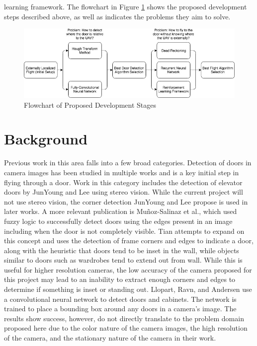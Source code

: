 \documentclass[12pt]{article}
\begin{document}
learning framework. The flowchart in Figure \ref{flowchart} shows the proposed development steps described above, as well as indicates the problems they aim to solve.

\begin{figure}
	\centering
	\includegraphics[scale=.55]{flowchart}
	\vspace{10pt}
	\caption[Flowchart of Proposed Development Stages]{Flowchart of Proposed Development Stages}
	\label{flowchart}
\end{figure}

\section{Background}
Previous work in this area falls into a few broad categories. Detection of doors in camera images has been studied in multiple works and is a key initial step in flying through a door. Work in this category includes the detection of elevator doors by JunYoung and Lee \cite{ElevatorDoors} using stereo vision. While the current project will not use stereo vision, the corner detection JunYoung and Lee propose is used in later works. A more relevant publication is Mu\~noz-Salinaz et al.\cite{Fuzzy}, which used fuzzy logic to successfully detect doors using the edges present in an image including when the door is not completely visible. Tian \cite{Tian2013} attempts to expand on this concept and uses the detection of frame corners and edges to indicate a door, along with the heuristic that doors tend to be inset in the wall, while objects similar to doors such as wardrobes tend to extend out from wall. While this is useful for higher resolution cameras, the low accuracy of the camera proposed for this project may lead to an inability to extract enough corners and edges to determine if something is inset or standing out. Llopart, Ravn, and Andersen\cite{NNDoor} use a convolutional neural network to detect doors and cabinets. The network is trained to place a bounding box around any doors in a camera's image. The results show success, however, do not directly translate to the problem domain proposed here due to the color nature of the camera images, the high resolution of the camera, and the stationary nature of the camera in their work.
\end{document}
